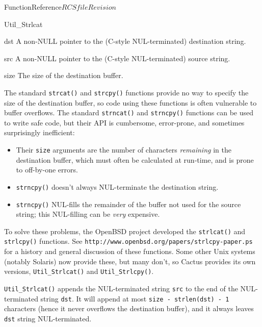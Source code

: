 \begin{cactuspart}{FunctionReference}{$RCSfile$}{$Revision$}
\begin{FunctionDescription}{Util\_Strlcat}
\begin{ParameterSection}
\begin{Parameter}{dst}
A non-NULL pointer to the (C-style NUL-terminated) destination string.
\end{Parameter}
\begin{Parameter}{src}
A non-NULL pointer to the (C-style NUL-terminated) source string.
\end{Parameter}
\begin{Parameter}{size}
The size of the destination buffer.
\end{Parameter}
\end{ParameterSection}

\begin{Discussion}
The standard \verb|strcat()| and \verb|strcpy()| functions provide
no way to specify the size of the destination buffer, so code using
these functions is often vulnerable to buffer overflows.  The standard
\verb|strncat()| and \verb|strncpy()| functions can be used to write
safe code, but their API is cumbersome, error-prone, and sometimes
surprisingly inefficient:
\begin{itemize}
\item	Their \verb|size| arguments are the number of characters
	{\em remaining\/} in the destination buffer, which must
	often be calculated at run-time, and is prone to off-by-one
	errors.
\item	\verb|strncpy()| doesn't always NUL-terminate the destination string.
\item	\verb|strncpy()| NUL-fills the remainder of the buffer not
	used for the source string; this NUL-filling can be {\em very\/}
	expensive.
\end{itemize}

To solve these problems, the OpenBSD project developed the
\verb|strlcat()| and \verb|strlcpy()| functions.  See
\verb|http://www.openbsd.org/papers/strlcpy-paper.ps|
for a history and general discussion of these functions.
Some other Unix systems (notably Solaris) now provide these,
but many don't, so Cactus provides its own versions,
\verb|Util_Strlcat()| and \verb|Util_Strlcpy()|.

\verb|Util_Strlcat()| appends the NUL-terminated string \verb|src| to the
end of the NUL-terminated string \verb|dst|.  It will append at most
\verb|size - strlen(dst) - 1| characters (hence it never overflows the
destination buffer), and it always leaves \verb|dst| string NUL-terminated.
\end{Discussion}


\end{FunctionDescription}
\end{cactuspart}

